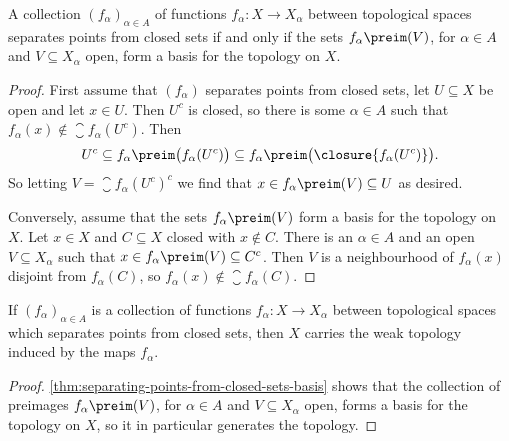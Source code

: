 \documentclass[article, a4paper, 11pt, oneside]{memoir}
\numberwithin{equation}{chapter}
\begin{document}
\begin{proposition}
    \label{thm:separating-points-from-closed-sets-basis}
    A collection $(f_\alpha)_{\alpha \in A}$ of functions $f_\alpha \colon X \to X_\alpha$ between topological spaces separates points from closed sets if and only if the sets $f_\alpha\preim(V)$, for $\alpha \in A$ and $V \subseteq X_\alpha$ open, form a basis for the topology on $X$.
\end{proposition}

\begin{proof}
    First assume that $(f_\alpha)$ separates points from closed sets, let $U \subseteq X$ be open and let $x \in U$. Then $U^c$ is closed, so there is some $\alpha \in A$ such that $f_\alpha(x) \not\in \closure{f_\alpha(U^c)}$. Then
    \begin{equation*}
        U^c
            \subseteq f_\alpha\preim \bigl( f_\alpha(U^c) \bigr)
            \subseteq f_\alpha\preim \bigl( \closure{f_\alpha(U^c)} \bigr).
    \end{equation*}
    So letting $V = \closure{f_\alpha(U^c)}^c$ we find that $x \in f_\alpha\preim(V) \subseteq U$ as desired.

    Conversely, assume that the sets $f_\alpha\preim(V)$ form a basis for the topology on $X$. Let $x \in X$ and $C \subseteq X$ closed with $x \not\in C$. There is an $\alpha \in A$ and an open $V \subseteq X_\alpha$ such that $x \in f_\alpha\preim(V) \subseteq C^c$. Then $V$ is a neighbourhood of $f_\alpha(x)$ disjoint from $f_\alpha(C)$, so $f_\alpha(x) \not\in \closure{f_\alpha(C)}$.
\end{proof}


\begin{corollary}
    \label{thm:separating-points-from-closed-sets-weak-topology}
    If $(f_\alpha)_{\alpha \in A}$ is a collection of functions $f_\alpha \colon X \to X_\alpha$ between topological spaces which separates points from closed sets, then $X$ carries the weak topology induced by the maps $f_\alpha$.
\end{corollary}

\begin{proof}
    \cref{thm:separating-points-from-closed-sets-basis} shows that the collection of preimages $f_\alpha\preim(V)$, for $\alpha \in A$ and $V \subseteq X_\alpha$ open, forms a basis for the topology on $X$, so it in particular generates the topology.
\end{proof}
\end{document}
